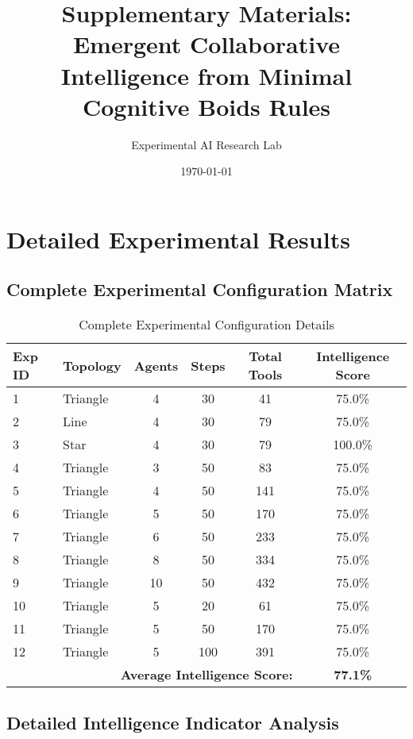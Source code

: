 \documentclass[10pt]{article}
\title{Supplementary Materials: Emergent Collaborative Intelligence from Minimal Cognitive Boids Rules}
\author{Experimental AI Research Lab}
\date{\today}
\begin{document}
\maketitle

\section{Detailed Experimental Results}

\subsection{Complete Experimental Configuration Matrix}

\begin{table}[H]
\centering
\caption{Complete Experimental Configuration Details}
\begin{tabular}{@{}llcccc@{}}
\toprule
\textbf{Exp ID} & \textbf{Topology} & \textbf{Agents} & \textbf{Steps} & \textbf{Total Tools} & \textbf{Intelligence Score} \\
\midrule
1 & Triangle & 4 & 30 & 41 & 75.0\% \\
2 & Line & 4 & 30 & 79 & 75.0\% \\
3 & Star & 4 & 30 & 79 & 100.0\% \\
4 & Triangle & 3 & 50 & 83 & 75.0\% \\
5 & Triangle & 4 & 50 & 141 & 75.0\% \\
6 & Triangle & 5 & 50 & 170 & 75.0\% \\
7 & Triangle & 6 & 50 & 233 & 75.0\% \\
8 & Triangle & 8 & 50 & 334 & 75.0\% \\
9 & Triangle & 10 & 50 & 432 & 75.0\% \\
10 & Triangle & 5 & 20 & 61 & 75.0\% \\
11 & Triangle & 5 & 50 & 170 & 75.0\% \\
12 & Triangle & 5 & 100 & 391 & 75.0\% \\
\midrule
\multicolumn{5}{r}{\textbf{Average Intelligence Score:}} & \textbf{77.1\%} \\
\bottomrule
\end{tabular}
\end{table}

\subsection{Detailed Intelligence Indicator Analysis}
\end{document}

